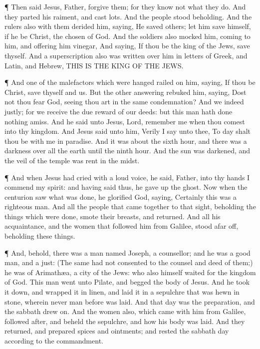  ¶ Then said Jesus, Father, forgive them; for they know not
what they do. And they parted his raiment, and cast lots. 
And the people stood beholding. And the rulers also with them derided
him, saying, He saved others; let him save himself, if he be Christ, the
chosen of God.  And the soldiers also mocked him, coming to
him, and offering him vinegar,  And saying, If thou be the
king of the Jews, save thyself.  And a superscription also
was written over him in letters of Greek, and Latin, and Hebrew, THIS IS
THE KING OF THE JEWS.

 ¶ And one of the malefactors which were hanged railed on
him, saying, If thou be Christ, save thyself and us.  But
the other answering rebuked him, saying, Dost not thou fear God, seeing
thou art in the same condemnation?  And we indeed justly;
for we receive the due reward of our deeds: but this man hath done
nothing amiss.  And he said unto Jesus, Lord, remember me
when thou comest into thy kingdom.  And Jesus said unto
him, Verily I say unto thee, To day shalt thou be with me in paradise.
 And it was about the sixth hour, and there was a darkness
over all the earth until the ninth hour.  And the sun was
darkened, and the veil of the temple was rent in the midst.

 ¶ And when Jesus had cried with a loud voice, he said,
Father, into thy hands I commend my spirit: and having said thus, he
gave up the ghost.  Now when the centurion saw what was
done, he glorified God, saying, Certainly this was a righteous man.
 And all the people that came together to that sight,
beholding the things which were done, smote their breasts, and returned.
 And all his acquaintance, and the women that followed him
from Galilee, stood afar off, beholding these things.

 ¶ And, behold, there was a man named Joseph, a counsellor;
and he was a good man, and a just:  (The same had not
consented to the counsel and deed of them;) he was of Arimathæa, a city
of the Jews: who also himself waited for the kingdom of God.
 This man went unto Pilate, and begged the body of Jesus.
 And he took it down, and wrapped it in linen, and laid it
in a sepulchre that was hewn in stone, wherein never man before was
laid.  And that day was the preparation, and the sabbath
drew on.  And the women also, which came with him from
Galilee, followed after, and beheld the sepulchre, and how his body was
laid.  And they returned, and prepared spices and
ointments; and rested the sabbath day according to the commandment.

